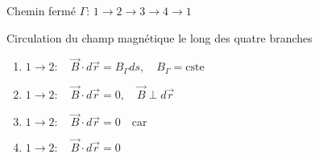 \documentclass[
    11pt,
    a4paper,
    oneside,
    headinlcude, footinclude,
    twoside,
]{report}
\renewcommand{\vec}[1]{\overrightarrow{#1}}
\begin{document}
Chemin fermé $\Gamma$: $1 \to 2 \to 3 \to 4 \to 1$

Circulation du champ magnétique le long des quatre branches 

\begin{enumerate}
    \item $1 \to 2: \quad \vec B \cdot d \vec r = B_{\Gamma} ds, \quad B_{\Gamma} = \text{cste}$ 
    \item $1 \to 2: \quad \vec B \cdot d \vec r = 0, \quad \vec B \perp d\vec r$ 
    \item $1 \to 2: \quad \vec B \cdot d \vec r = 0 \quad \text{car} \quad $ 
    \item $1 \to 2: \quad \vec B \cdot d \vec r = 0$ 
\end{enumerate}
\end{document}
